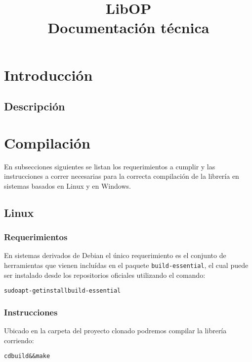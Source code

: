 \documentclass[12pt,a4paper,final]{article}
\author{}
\title{LibOP \\ Documentación técnica}
\date{}
\begin{document}
\maketitle

\tableofcontents

\clearpage

\section{Introducción}


\subsection{Descripción}
	
	
\section{Compilación}
	En subsecciones siguientes se listan los requerimientos a cumplir y las instrucciones
	a correr necesarias para la correcta compilación de la librería en sistemas basados
	en Linux y en Windows. 	 
	
	\subsection{Linux}
		
		\subsubsection{Requerimientos}
			En sistemas derivados de Debian el único requerimiento es el conjunto de 
			herramientas que vienen incluídas en el paquete \texttt{build-essential},
			el cual puede ser instalado desde los repositorios
			oficiales utilizando el comando:
			
			\begin{alltt}
				sudo apt-get install build-essential
			\end{alltt}	
			
		\subsubsection{Instrucciones}
			Ubicado en la carpeta del proyecto clonado podremos compilar la librería corriendo:
			
			\begin{alltt}
				cd build && make
			\end{alltt}
\end{document}
